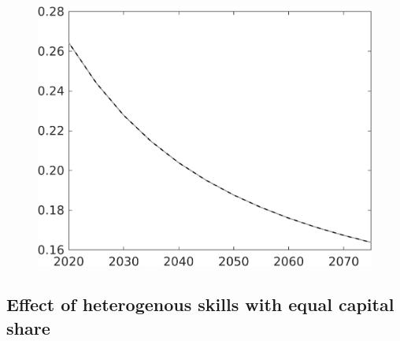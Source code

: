 \documentclass[12pt]{article}
\begin{document}
\begin{figure}
\begin{minipage}[]{0.32\textwidth}
	\end{minipage}	
	\begin{minipage}[]{0.32\textwidth}
		\includegraphics[width=1\textwidth]{../../codding_model/own_basedOnFried/optimalPol_010922_revision/figures/all_13Sept22/CompTaul_Equlab_LFBAU_Reg0_sg_spillover0_nsk1_xgr0_knspil0_sep1_countec0_GovRev0_etaa0.79_lgd0.png}
	\end{minipage}	
\end{figure}


\clearpage \newpage
\subsection{Effect of heterogenous skills with equal capital share}
\end{document}
